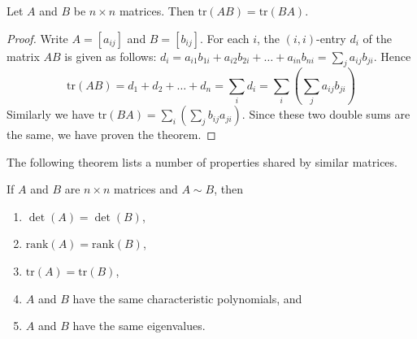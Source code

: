 \documentclass{ximera}
\begin{document}
\begin{theorem}\label{th:trAB=trBA}
Let $A$ and $B$ be $n \times n$ matrices. Then $\mbox{tr}(AB) = \mbox{tr}(BA)$.
\end{theorem}

\begin{proof}
Write $A = [a_{ij}]$ and $B = [b_{ij}]$. For each $i$, the $(i, i)$-entry $d_{i}$ of the matrix $AB$ is given as follows: $d_{i} = a_{i1}b_{1i} + a_{i2}b_{2i} + \dots + a_{in}b_{ni} = \sum_{j}a_{ij}b_{ji}$. Hence
\begin{equation*}
\mbox{tr}(AB) = d_1 + d_2 + \dots + d_n = \sum_{i}d_i = \sum_{i}\left(\sum_{j}a_{ij}b_{ji}\right)
\end{equation*}
Similarly we have $\mbox{tr}(BA) = \sum_{i}\left(\sum_{j}b_{ij}a_{ji}\right)$. Since these two double sums are the same, we have proven the theorem.
\end{proof}

The following theorem lists a number of properties shared by similar matrices.

\begin{theorem}\label{th:properties_similar}
If $A$ and $B$ are $n\times n$ matrices and $A\sim B$, then
\begin{enumerate}
\item\label{th:properties_similar_det} $\det(A) = \det(B)$,
\item\label{th:properties_similar_rank} $\mbox{rank}(A) = \mbox{rank}(B)$,
\item\label{th:properties_similar_trace} $\mbox{tr}(A)= \mbox{tr}(B)$,
\item\label{th:properties_similar_char_poly} $A$ and $B$ have the same characteristic polynomials, and
\item\label{th:properties_similar_eig} $A$ and $B$ have the same eigenvalues.
\end{enumerate}
\end{theorem}
\end{document}
